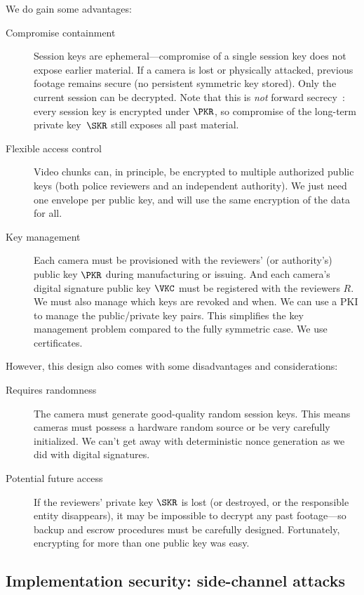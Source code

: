 We do gain some advantages:
\begin{description}
  \item[Compromise containment] Session keys are ephemeral---compromise of a
    single session key does not expose earlier material.
    If a camera is lost or physically attacked, previous footage remains
    secure (no persistent symmetric key stored).
    Only the current session can be decrypted.
    Note that this is \emph{not} forward
    secrecy~\autocite{PerfectForwardSecrecy,AuthKeyExchange}: every session
    key is encrypted under \(\PKR\), so compromise of the long-term private
    key~\(\SKR\) still exposes all past material.
  \item[Flexible access control] Video chunks can, in principle, be encrypted 
    to multiple authorized public keys (\eg both police reviewers and an 
    independent authority).
    We just need one envelope per public key, and will use the same encryption 
    of the data for all.
  \item[Key management] Each camera must be provisioned with the reviewers'
    (or authority's) public key \(\PKR\) during manufacturing or issuing.
    And each camera's digital signature public key \(\VKC\) must be registered
    with the reviewers \(R\).
    We must also manage which keys are revoked and when.
    We can use a \ac{PKI} to manage the public/private
    key pairs.
    This simplifies the key management problem compared to the fully symmetric 
    case.
    We use certificates.
\end{description}

However, this design also comes with some disadvantages and considerations:
\begin{description}
  \item[Requires randomness] The camera must generate good-quality random 
    session keys.
    This means cameras must possess a hardware random source or be very 
    carefully initialized.
    We can't get away with deterministic nonce generation as we did with 
    digital signatures.
  \item[Potential future access] If the reviewers' private key \(\SKR\) is lost 
    (or destroyed, or the responsible entity disappears), it may be impossible 
    to decrypt any past footage---so backup and escrow procedures must be 
    carefully designed.
    Fortunately, encrypting for more than one public key was easy.
\end{description}

\subsection{Implementation security: side-channel attacks}

